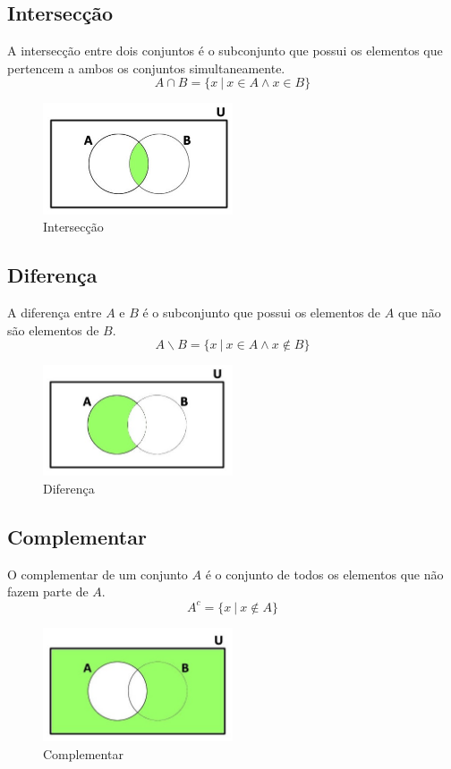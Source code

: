 \subsection*{Intersecção}
A intersecção entre dois conjuntos é o subconjunto que possui os elementos que pertencem a ambos os conjuntos simultaneamente.
\[A \cap B = \{x \: | \: x\in A \wedge x \in B\}\]
\begin{figure}[H]
  \caption{Intersecção}
  \centering
  \includegraphics[width=0.5\textwidth]{algebra/imagens/intersect}
\end{figure}

\subsection*{Diferença}
A diferença entre $A$ e $B$ é o subconjunto que possui os elementos de $A$ que não são elementos de $B$.
\[A \smallsetminus B = \{x \: | \: x \in A \wedge x \not \in B\}\]
\begin{figure}[H]
  \caption{Diferença}
  \centering
  \includegraphics[width=0.5\textwidth]{algebra/imagens/diferen}
\end{figure}

\subsection*{Complementar}
O complementar de um conjunto $A$ é o conjunto de todos os elementos que não fazem parte de $A$.
\[A^{c}=\{x \: | \: x \not \in A\}\]
\begin{figure}[H]
  \caption{Complementar}
  \centering
  \includegraphics[width=0.5\textwidth]{algebra/imagens/comp}
\end{figure}

